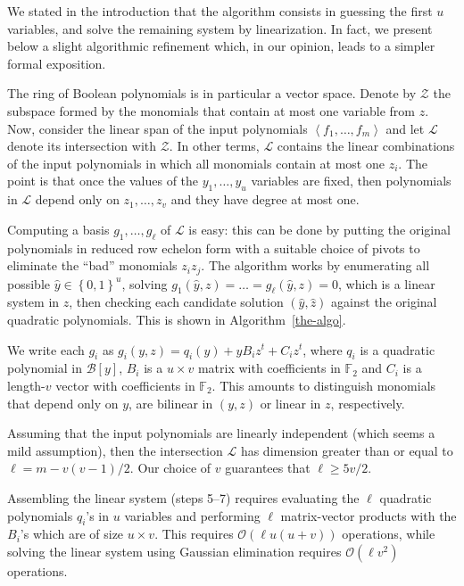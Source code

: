 \documentclass[twoside,leqno]{article}
\newcommand{\bits}{\left\{0, 1\right\}}
\newcommand{\bigO}[1]{\ensuremath{\mathcal{O}\left( #1 \right)} }
\begin{document}
We stated in the introduction that the algorithm consists in guessing the first
$u$ variables, and solve the remaining system by linearization. In fact, we
present below a slight algorithmic refinement which, in our opinion, leads to a
simpler formal exposition.

The ring of Boolean polynomials is in particular a vector space. Denote by
$\mathcal{Z}$ the subspace formed by the monomials that contain at most one
variable from $z$. Now, consider the linear span of the input polynomials
$\left\langle f_1, \dots, f_m\right\rangle$ and let $\mathcal{L}$ denote its
intersection with $\mathcal{Z}$. In other terms, $\mathcal{L}$ contains the
linear combinations of the input polynomials in which all monomials contain at
most one $z_i$. The point is that once the values of the $y_1, \dots, y_u$
variables are fixed, then polynomials in $\mathcal{L}$ depend only on
$z_1, \dots, z_v$ and they have degree at most one.

Computing a basis $g_1, \dots, g_\ell$ of $\mathcal{L}$ is easy: this can be
done by putting the original polynomials in reduced row echelon form with a
suitable choice of pivots to eliminate the ``bad'' monomials $z_i z_j$. The
algorithm works by enumerating all possible $\hat y \in \bits^u$, solving
$g_1(\hat y, z) = \dots = g_\ell(\hat y, z) = 0$, which is a linear system in
$z$, then checking each candidate solution $(\hat y, \hat z)$ against the
original quadratic polynomials. This is shown in Algorithm~\ref{the-algo}.

We write each $g_i$ as $g_i(y, z) = q_i(y) + y B_i z^t + C_i z^t$, where $q_i$
is a quadratic polynomial in $\mathcal{B}[y]$, $B_i$ is a $u \times v$ matrix
with coefficients in $\mathbb{F}_2$ and $C_i$ is a length-$v$ vector with
coefficients in $\mathbb{F}_2$. This amounts to distinguish monomials that
depend only on $y$, are bilinear in $(y, z)$ or linear in $z$, respectively.

Assuming that the input polynomials are linearly independent (which seems a mild
assumption), then the intersection $\mathcal{L}$ has dimension greater than or
equal to $\ell = m - v(v-1)/2$. Our choice of $v$ guarantees that
$\ell \geq 5v/2$.

Assembling the linear system (steps 5--7) requires evaluating the $\ell$
quadratic polynomials $q_i$'s in $u$ variables and performing $\ell$
matrix-vector products with the $B_i$'s which are of size $u \times v$.  This
requires $\bigO{\ell u(u+v)}$ operations, while solving the linear system using
Gaussian elimination requires $\bigO{\ell v^2}$ operations.
\end{document}
